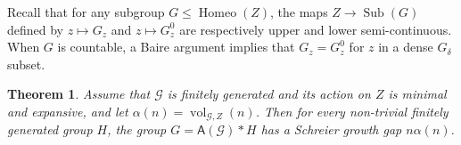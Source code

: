 \documentclass[11pt]{amsart}
\newcommand{\Gcal}{\ensuremath{\mathcal{G}}}%
\newcommand{\vol}{\ensuremath{\operatorname{vol}}}%
\newcommand{\sub}{\ensuremath{\operatorname{Sub}}}%
\newcommand{\homeo}{\ensuremath{\operatorname{Homeo}}}%
\newcommand{\Asf}{\ensuremath{\mathsf{A}}}
\theoremstyle{definition}
\theoremstyle{plain}
\newtheorem{thm}[defin]{Theorem}
\theoremstyle{remark}
\begin{document}

Recall that for any subgroup $G \le \homeo(Z)$, the maps $Z \to \sub(G)$ defined by $z\mapsto G_z$ and $z\mapsto G^0_z$ are respectively upper and lower semi-continuous. When $G$ is countable, a Baire argument implies that $G_z=G^0_z$ for $z$ in a dense $G_\delta$ subset.






\begin{thm}
Assume that $\Gcal$ is finitely generated and its action on $Z$ is minimal and expansive, and let  $\alpha(n)=\vol_{\mathcal{G}, Z}(n)$.  Then for every non-trivial finitely generated group $H$, the group $G = \Asf(\Gcal)\ast H$ has a Schreier growth gap $n\alpha(n)$. 
\end{thm}
\end{document}
